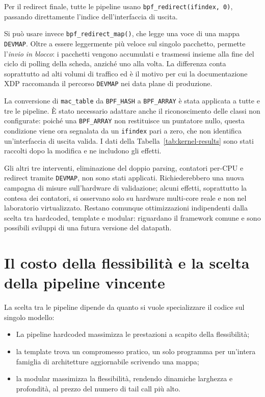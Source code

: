 \documentclass[binding=0.6cm,italian,oneside,noexaminfo]{sapthesis}
\begin{document}
Per il redirect finale, tutte le pipeline usano \texttt{bpf\_redirect(ifindex, 0)}, passando direttamente l'indice dell'interfaccia di uscita.

Si può usare invece \texttt{bpf\_redirect\_map()}, che legge una voce di una mappa \texttt{DEVMAP}. Oltre a essere leggermente più veloce sul singolo pacchetto, permette l'\emph{invio in blocco}: i pacchetti vengono accumulati e trasmessi insieme alla fine del ciclo di polling della scheda, anziché uno alla volta. La differenza conta soprattutto ad alti volumi di traffico ed è il motivo per cui la documentazione XDP raccomanda il percorso \texttt{DEVMAP} nei data plane di produzione.

La conversione di \texttt{mac\_table} da \texttt{BPF\_HASH} a \texttt{BPF\_ARRAY} è stata applicata a tutte e tre le pipeline. È stato necessario adattare anche il riconoscimento delle classi non configurate: poiché una \texttt{BPF\_ARRAY} non restituisce un puntatore nullo, questa condizione viene ora segnalata da un \texttt{ifindex} pari a zero, che non identifica un'interfaccia di uscita valida. I dati della Tabella~\ref{tab:kernel-results} sono stati raccolti dopo la modifica e ne includono gli effetti.

Gli altri tre interventi, eliminazione del doppio parsing, contatori per-CPU e redirect tramite \texttt{DEVMAP}, non sono stati applicati. Richiederebbero una nuova campagna di misure sull'hardware di validazione; alcuni effetti, soprattutto la contesa dei contatori, si osservano solo su hardware multi-core reale e non nel laboratorio virtualizzato. Restano comunque ottimizzazioni indipendenti dalla scelta tra hardcoded, template e modular: riguardano il framework comune e sono possibili sviluppi di una futura versione del datapath.

\section{Il costo della flessibilità e la scelta della pipeline vincente}

La scelta tra le pipeline dipende da quanto si vuole specializzare il codice sul singolo modello:
\begin{itemize}
    \item La pipeline hardcoded massimizza le prestazioni a scapito della flessibilità;
    \item la template trova un compromesso pratico, un solo programma per un'intera famiglia di architetture aggiornabile scrivendo una mappa;
    \item la modular massimizza la flessibilità, rendendo dinamiche larghezza e profondità, al prezzo del numero di tail call più alto.
\end{itemize}
\end{document}
